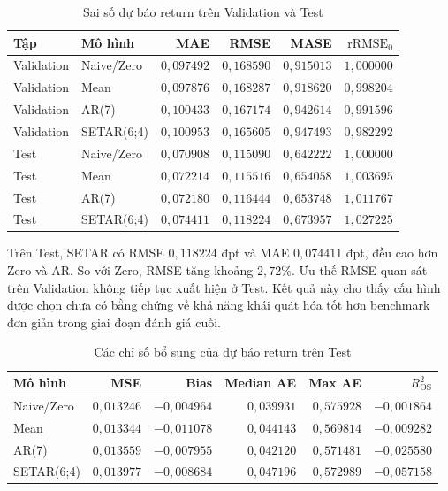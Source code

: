 \documentclass[a4paper,reqno,oneside]{book}
\numberwithin{equation}{chapter}
\begin{document}
\begin{table}[htbp]
\centering\small
\caption{Sai số dự báo return trên Validation và Test}
\label{tab:setar-return}
\begin{tabular}{llrrrr}
\toprule
Tập & Mô hình & MAE & RMSE & MASE & $\mathrm{rRMSE}_0$ \\
\midrule
Validation & Naive/Zero & $0{,}097492$ & $0{,}168590$ & $0{,}915013$ & $1{,}000000$ \\
Validation & Mean & $0{,}097876$ & $0{,}168287$ & $0{,}918620$ & $0{,}998204$ \\
Validation & AR(7) & $0{,}100433$ & $0{,}167174$ & $0{,}942614$ & $0{,}991596$ \\
Validation & SETAR(6;4) & $0{,}100953$ & $0{,}165605$ & $0{,}947493$ & $0{,}982292$ \\
Test & Naive/Zero & $0{,}070908$ & $0{,}115090$ & $0{,}642222$ & $1{,}000000$ \\
Test & Mean & $0{,}072214$ & $0{,}115516$ & $0{,}654058$ & $1{,}003695$ \\
Test & AR(7) & $0{,}072180$ & $0{,}116444$ & $0{,}653748$ & $1{,}011767$ \\
Test & SETAR(6;4) & $0{,}074411$ & $0{,}118224$ & $0{,}673957$ & $1{,}027225$ \\
\bottomrule
\end{tabular}
\end{table}

Trên Test, SETAR có RMSE $0{,}118224$ đpt và MAE $0{,}074411$ đpt, đều cao hơn Zero và AR. So với Zero, RMSE tăng khoảng $2{,}72\%$. Ưu thế RMSE quan sát trên Validation không tiếp tục xuất hiện ở Test. Kết quả này cho thấy cấu hình được chọn chưa có bằng chứng về khả năng khái quát hóa tốt hơn benchmark đơn giản trong giai đoạn đánh giá cuối.

\begin{table}[htbp]
\centering\small
\caption{Các chỉ số bổ sung của dự báo return trên Test}
\label{tab:setar-return-extra}
\begin{tabular}{lrrrrr}
\toprule
Mô hình & MSE & Bias & Median AE & Max AE & $R^2_{\mathrm{OS}}$ \\
\midrule
Naive/Zero & $0{,}013246$ & $-0{,}004964$ & $0{,}039931$ & $0{,}575928$ & $-0{,}001864$ \\
Mean & $0{,}013344$ & $-0{,}011078$ & $0{,}044143$ & $0{,}569814$ & $-0{,}009282$ \\
AR(7) & $0{,}013559$ & $-0{,}007955$ & $0{,}042120$ & $0{,}571481$ & $-0{,}025580$ \\
SETAR(6;4) & $0{,}013977$ & $-0{,}008684$ & $0{,}047196$ & $0{,}572989$ & $-0{,}057158$ \\
\bottomrule
\end{tabular}
\end{table}
\end{document}
